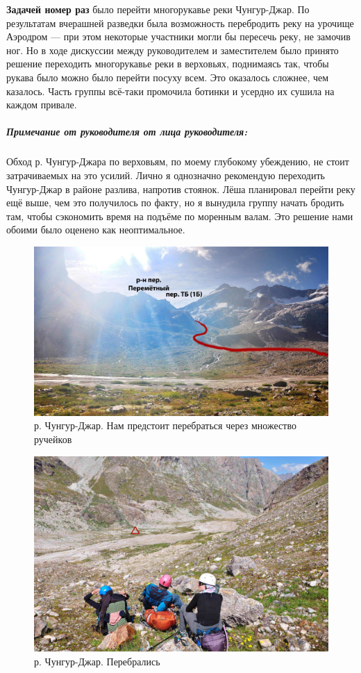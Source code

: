 \textbf{Задачей номер раз} было перейти многорукавье реки Чунгур-Джар. По результатам вчерашней разведки была возможность перебродить реку на урочище Аэродром --- при этом некоторые участники могли бы пересечь реку, не замочив ног. Но в ходе дискуссии между руководителем и заместителем было принято решение переходить многорукавье реки в верховьях, поднимаясь так, чтобы рукава было можно было перейти посуху всем. Это оказалось сложнее, чем казалось. Часть группы всё-таки промочила ботинки и усердно их сушила на каждом привале. 

\subparagraph{Примечание от руководителя от лица руководителя:} Обход р. Чунгур-Джара по верховьям, по моему глубокому убеждению, не стоит затрачиваемых на это усилий. Лично я однозначно рекомендую переходить Чунгур-Джар в районе разлива, напротив стоянок. Лёша планировал перейти реку ещё выше, чем это получилось по факту, но я вынудила группу начать бродить там, чтобы сэкономить время на подъёме по моренным валам. Это решение нами обоими было оценено как неоптимальное. 
\begin{figure}[h!]
	\centering
	\includegraphics[width=0.7\linewidth]{../pics/DSC_0254.jpg}
	\caption{р. Чунгур-Джар. Нам предстоит перебраться через множество ручейков}
	\label{fig:DSC_0254}
\end{figure}

\begin{figure}[h!]
	\centering
	\includegraphics[width=0.7\linewidth]{../pics/DSC_0277.jpg}
	\caption{р. Чунгур-Джар. Перебрались}
	\label{fig:DSC_0277}
\end{figure}

